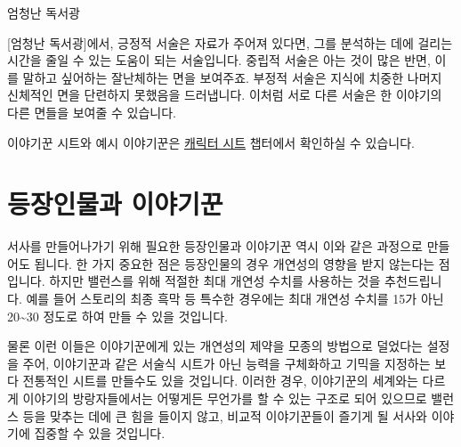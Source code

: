\documentclass{report}
\begin{document}
	\begin{lite}{엄청난 독서광}
		
		
	\end{lite}
	
	[엄청난 독서광]에서, 긍정적 서술은 자료가 주어져 있다면, 그를 분석하는 데에 걸리는 시간을 줄일 수 있는 도움이 되는 서술입니다. 중립적 서술은 아는 것이 많은 반면, 이를 말하고 싶어하는 잘난체하는 면을 보여주죠. 부정적 서술은 지식에 치중한 나머지 신체적인 면을 단련하지 못했음을 드러냅니다. 이처럼 서로 다른 서술은 한 이야기의 다른 면들을 보여줄 수 있습니다.
	
	\bigskip
	
	이야기꾼 시트와 예시 이야기꾼은 \hyperlink{lite-sheets}{캐릭터 시트} 챕터에서 확인하실 수 있습니다.
	
	\section*{등장인물과 이야기꾼}
	서사를 만들어나가기 위해 필요한 등장인물과 이야기꾼 역시 이와 같은 과정으로 만들어도 됩니다. 한 가지 중요한 점은 등장인물의 경우 개연성의 영향을 받지 않는다는 점입니다. 하지만 밸런스를 위해 적절한 최대 개연성 수치를 사용하는 것을 추천드립니다. 예를 들어 스토리의 최종 흑막 등 특수한 경우에는 최대 개연성 수치를 15가 아닌 20\textasciitilde30 정도로 하여 만들 수 있을 것입니다.
	
	물론 이런 이들은 이야기꾼에게 있는 개연성의 제약을 모종의 방법으로 덜었다는 설정을 주어, 이야기꾼과 같은 서술식 시트가 아닌 능력을 구체화하고 기믹을 지정하는 보다 전통적인 시트를 만들수도 있을 것입니다. 이러한 경우, 이야기꾼의 세계와는 다르게 이야기의 방랑자들에서는 어떻게든 무언가를 할 수 있는 구조로 되어 있으므로 밸런스 등을 맞추는 데에 큰 힘을 들이지 않고, 비교적 이야기꾼들이 즐기게 될 서사와 이야기에 집중할 수 있을 것입니다.
\end{document}
